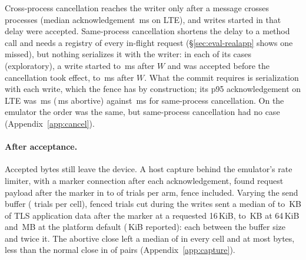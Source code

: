 Cross-process cancellation reaches the writer only after a message crosses processes (median acknowledgement
\dfCloseLteAckMed{}\,ms on LTE), and writes started in that delay were accepted. Same-process cancellation shortens the
delay to a method call and needs a registry of every in-flight request (\S\ref{sec:eval-realapp} shows one missed), but
nothing serializes it with the writer: in each of its \dfCloseTwoTimed{} cases (exploratory), a write started
\dfCloseTwoPostWLo{} to \dfCloseTwoPostWHi{}\,ms after $W$ and was accepted before the cancellation took effect,
\dfCloseTwoCancelLo{} to \dfCloseTwoCancelHi{}\,ms after $W$. What the commit requires
is serialization with each write, which the fence has by construction; its p95 acknowledgement on LTE was
\dfFenceAckP{}\,ms (\dfAbortAckP{}\,ms abortive) against \dfCloseTwoAckP{}\,ms for same-process cancellation. On the
emulator the order was the same, but same-process cancellation had no case (Appendix~\ref{app:cancel}).

\paragraph{After acceptance.} Accepted bytes still leave the device. A host capture behind the emulator's rate limiter,
with a marker connection after each acknowledgement, found request payload after the marker in \gtrCapLo{} to
\gtrCapHi{} of \gtrN{} trials per arm, fence included. Varying the send buffer (\gsN{} trials per cell), fenced trials cut during the writes sent a median of \gsFenceSmallLo{} to \gsFenceSmallHi{}\,KB of
TLS application data after the marker at a requested 16\,KiB, \gsFenceMidLo{} to \gsFenceMidHi{}\,KB at 64\,KiB and
\gsFenceDefHi{}\,MB at the platform default (\gsDefaultKib{}\,KiB reported): each between the buffer size and twice it. The abortive close left a median
of \gsAbortMed{} in every cell and at most \gsAbortMax{} bytes, less than the normal close in \gsAbortLess{} of \gsPairs{} pairs
(Appendix~\ref{app:capture}).

